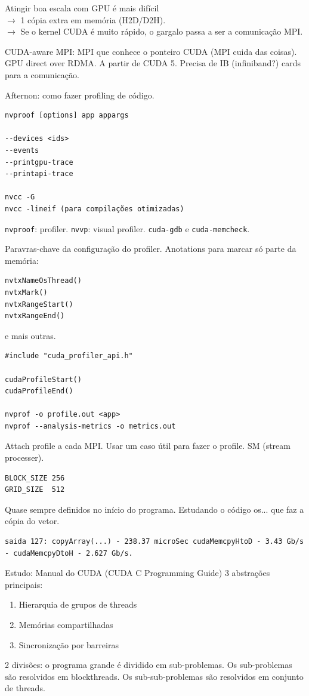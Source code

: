 \documentclass[12pt]{report} %
\begin{document}
Atingir boa escala com GPU é mais difícil\\
$\rightarrow$ 1 cópia extra em memória (H2D/D2H).\\
$\rightarrow$ Se o kernel CUDA é muito rápido, o gargalo passa a ser a comunicação MPI.

CUDA-aware MPI: MPI que conhece o ponteiro CUDA (MPI cuida das coisas). GPU direct over RDMA. A partir de CUDA 5. Precisa de IB (infiniband?) cards para a comunicação.

Afternon: como fazer profiling de código.

\begin{verbatim}
nvproof [options] app appargs

--devices <ids>
--events
--printgpu-trace
--printapi-trace

nvcc -G
nvcc -lineif (para compilações otimizadas)
\end{verbatim}

\texttt{nvproof}: profiler. \texttt{nvvp}: visual profiler. \texttt{cuda-gdb} e \texttt{cuda-memcheck}.

Paravras-chave da configuração do profiler. Anotations para marcar só parte da memória:
\begin{verbatim}
nvtxNameOsThread()
nvtxMark()
nvtxRangeStart()
nvtxRangeEnd()
\end{verbatim}

e mais outras.

\begin{verbatim}
#include "cuda_profiler_api.h"

cudaProfileStart()
cudaProfileEnd()

nvprof -o profile.out <app>
nvprof --analysis-metrics -o metrics.out
\end{verbatim}
Attach profile a cada MPI. Usar um caso útil para fazer o profile. SM (stream processer).
\begin{verbatim}
BLOCK_SIZE 256
GRID_SIZE  512
\end{verbatim}
Quase sempre definidos no início do programa. Estudando o código os... que faz a cópia do vetor.
\begin{verbatim}
saida 127: copyArray(...) - 238.37 microSec cudaMemcpyHtoD - 3.43 Gb/s - cudaMemcpyDtoH - 2.627 Gb/s.
\end{verbatim}

Estudo: Manual do CUDA (CUDA C Programming Guide)
3 abstrações principais:
\begin{enumerate}
	\item Hierarquia de grupos de threads
	\item Memórias compartilhadas
	\item Sincronização por barreiras
\end{enumerate}
2 divisões: o programa grande é dividido em sub-problemas. Os sub-problemas são resolvidos em blockthreads. Os sub-sub-problemas são resolvidos em conjunto de threads.
\end{document}
